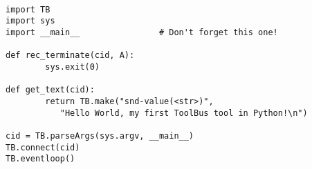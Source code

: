 \begin{verbatim}

import TB
import sys
import __main__                # Don't forget this one!

def rec_terminate(cid, A):
        sys.exit(0)

def get_text(cid):
        return TB.make("snd-value(<str>)", 
           "Hello World, my first ToolBus tool in Python!\n")

cid = TB.parseArgs(sys.argv, __main__)
TB.connect(cid)
TB.eventloop()
\end{verbatim}
